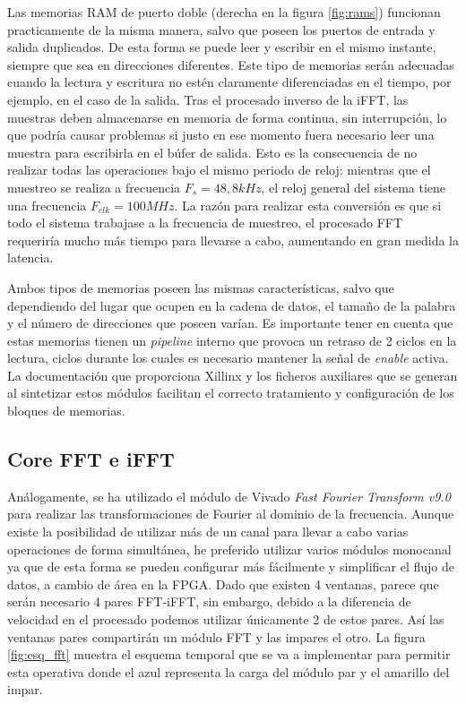 Las memorias RAM de puerto doble (derecha en la figura \ref{fig:rams}) funcionan practicamente de la misma manera, salvo que poseen los puertos de entrada y salida duplicados. De esta forma se puede leer y escribir en el mismo instante, siempre que sea en direcciones diferentes. Este tipo de memorias serán adecuadas cuando la lectura y escritura no estén claramente diferenciadas en el tiempo, por ejemplo, en el caso de la salida. Tras el procesado inverso de la iFFT, las muestras deben almacenarse en memoria de forma continua, sin interrupción, lo que podría causar problemas si justo en ese momento fuera necesario leer una muestra para escribirla en el búfer de salida. Esto es la consecuencia de no realizar todas las operaciones bajo el mismo periodo de reloj: mientras que el muestreo se realiza a frecuencia $F_{s}=48,8kHz$, el reloj general del sistema tiene una frecuencia $F_{clk} = 100MHz$. La razón para realizar esta conversión es que si todo el sistema trabajase a la frecuencia de muestreo, el procesado FFT requeriría mucho más tiempo para llevarse a cabo, aumentando en gran medida la latencia. 

Ambos tipos de memorias poseen las mismas características, salvo que dependiendo del lugar que ocupen en la cadena de datos, el tamaño de la palabra y el número de direcciones que poseen varían. Es importante tener en cuenta que estas memorias tienen un \emph{pipeline} interno que provoca un retraso de 2 ciclos en la lectura, ciclos durante los cuales es necesario mantener la señal de \emph{enable} activa. La documentación que proporciona Xillinx y los ficheros auxiliares que se generan al sintetizar estos módulos facilitan el correcto tratamiento y configuración de los bloques de memorias.

\subsection{Core FFT e iFFT\label{ap:FFT}}
Análogamente, se ha utilizado el módulo de Vivado \emph{Fast Fourier Transform v9.0}~\cite{fftdoc} para realizar las transformaciones de Fourier al dominio de la frecuencia. Aunque existe la posibilidad de utilizar más de un canal para llevar a cabo varias operaciones de forma simultánea, he preferido utilizar varios módulos monocanal ya que de esta forma se pueden configurar más fácilmente y simplificar el flujo de datos, a cambio de área en la FPGA. Dado que existen 4 ventanas, parece que serán necesario 4 pares FFT-iFFT, sin embargo, debido a la diferencia de velocidad en el procesado podemos utilizar únicamente 2 de estos pares. Así las ventanas pares compartirán un módulo FFT y las impares el otro. La figura \ref{fig:esq_fft} muestra el esquema temporal que se va a implementar para permitir esta operativa donde el azul representa la carga del módulo par y el amarillo del impar.
 
